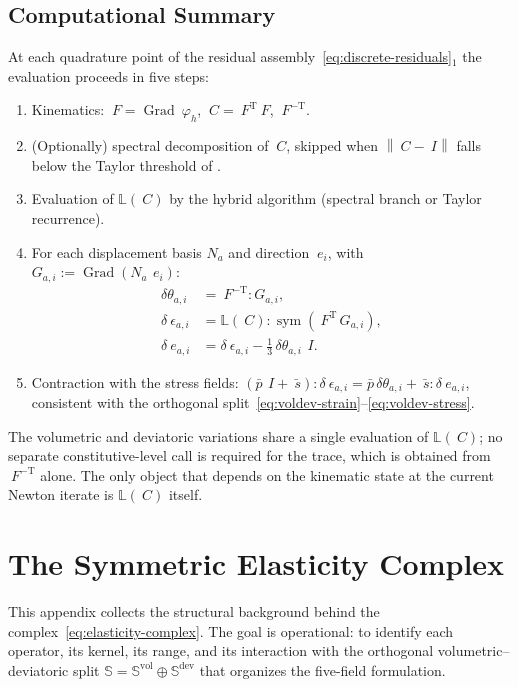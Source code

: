 \documentclass[12pt]{article}
\newcommand{\F}{~F}
\newcommand{\C}{~C}
\newcommand{\eps}{~\epsilon}
\newcommand{\edev}{~e}
\newcommand{\sbar}{\bar{~s}}
\newcommand{\pbar}{\bar{p}}
\newcommand{\Syms}{\mathbb{S}}
\newcommand{\supvol}{^{\mathrm{vol}}}
\newcommand{\supdev}{^{\mathrm{dev}}}
\newcommand{\Symsd}{\mathbb{S}\supdev}
\newcommand{\norm}[1]{\left\lVert {#1} \right\rVert}
\DeclareMathOperator{\Grad}{Grad}
\DeclareMathOperator{\sym}{sym}
\newcommand{\transpose}[1]{{#1}^{\mathrm{T}}}
\begin{document}
\subsection{Computational Summary}
\label{app:summary}

At each quadrature point of the residual
assembly~\eqref{eq:discrete-residuals}$_1$ the evaluation proceeds in
five steps:
\begin{enumerate}
  \item Kinematics: $\F = \Grad ~\varphi_h$,
    $\C = \transpose{\F}\F$, $\F^{-\mathrm{T}}$.
  \item (Optionally) spectral decomposition of $\C$, skipped when
    $\norm{\C - ~I}$ falls below the Taylor threshold of
    \citet{Ortiz.Radovitzky.Repetto:2001}.
  \item Evaluation of $\mathbb{L}(\C)$ by the hybrid algorithm
    (spectral branch or Taylor recurrence).
  \item For each displacement basis $N_a$ and direction
    $~e_i$, with $G_{a,i} := \Grad(N_a\, ~e_i)$:
    \begin{align*}
      \delta\theta_{a,i}
        & =
        \F^{-\mathrm{T}} : G_{a,i},
      \\
      \delta\eps_{a,i}
        & =
        \mathbb{L}(\C) : \sym\!\left(\transpose{\F}\, G_{a,i}\right),
      \\
      \delta\edev_{a,i}
        & =
        \delta\eps_{a,i}
        -
        \tfrac{1}{3}\,\delta\theta_{a,i}\, ~I.
    \end{align*}
  \item Contraction with the stress fields:
    $(\pbar\, ~I + \sbar) : \delta\eps_{a,i}
    = \pbar\,\delta\theta_{a,i} + \sbar : \delta\edev_{a,i}$,
    consistent with the orthogonal
    split~\eqref{eq:voldev-strain}--\eqref{eq:voldev-stress}.
\end{enumerate}
The volumetric and deviatoric variations share a single evaluation
of $\mathbb{L}(\C)$; no separate constitutive-level call is required
for the trace, which is obtained from $\F^{-\mathrm{T}}$ alone. The
only object that depends on the kinematic state at the current
Newton iterate is $\mathbb{L}(\C)$ itself.


\section{The Symmetric Elasticity Complex}
\label{app:sec}

This appendix collects the structural background behind the
complex~\eqref{eq:elasticity-complex}. The goal is operational: to
identify each operator, its kernel, its range, and its interaction
with the orthogonal volumetric--deviatoric split
$\Syms = \Syms\supvol \oplus \Symsd$ that organizes the five-field
formulation.
\end{document}
